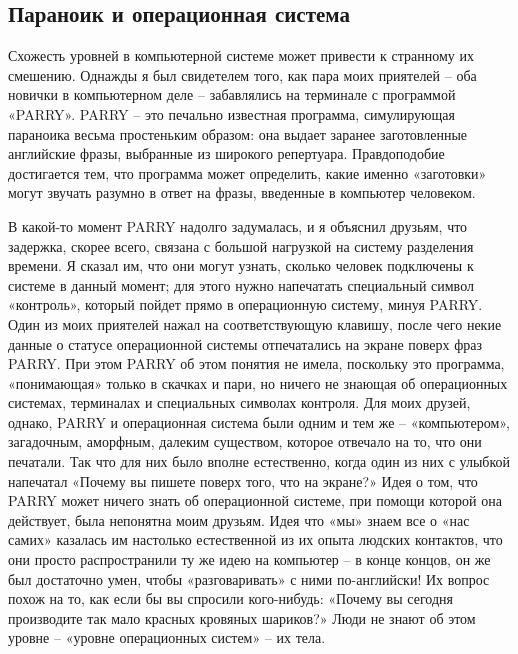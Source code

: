 \documentclass[../main.tex]{subfiles}
\begin{document}
\subsection{Параноик и операционная система}

Схожесть уровней в компьютерной системе может привести к странному их смешению. Однажды я был свидетелем того, как пара моих приятелей \--- оба новички в компьютерном деле \--- забавлялись на терминале с программой «PARRY». PARRY \--- это печально известная программа, симулирующая параноика весьма простеньким образом: она выдает заранее заготовленные английские фразы, выбранные из широкого репертуара. Правдоподобие достигается тем, что программа может определить, какие именно «заготовки» могут звучать разумно в ответ на фразы, введенные в компьютер человеком.

В какой-то момент PARRY надолго задумалась, и я объяснил друзьям, что задержка, скорее всего, связана с большой нагрузкой на систему разделения времени. Я сказал им, что они могут узнать, сколько человек подключены к системе в данный момент; для этого нужно напечатать специальный символ «контроль», который пойдет прямо в операционную систему, минуя PARRY. Один из моих приятелей нажал на соответствующую клавишу, после чего некие данные о статусе операционной системы отпечатались на экране поверх фраз PARRY. При этом PARRY об этом понятия не имела, поскольку это программа, «понимающая» только в скачках и пари, но ничего не знающая об операционных системах, терминалах и специальных символах контроля. Для моих друзей, однако, PARRY и операционная система были одним и тем же \--- «компьютером», загадочным, аморфным, далеким существом, которое отвечало на то, что они печатали. Так что для них было вполне естественно, когда один из них с улыбкой напечатал «Почему вы пишете поверх того, что на экране?» Идея о том, что PARRY может ничего знать об операционной системе, при помощи которой она действует, была непонятна моим друзьям. Идея что «мы» знаем все о «нас самих» казалась им настолько естественной из их опыта людских контактов, что они просто распространили ту же идею на компьютер \--- в конце концов, он же был достаточно умен, чтобы «разговаривать» с ними по-английски! Их вопрос похож на то, как если бы вы спросили кого-нибудь: «Почему вы сегодня производите так мало красных кровяных шариков?» Люди не знают об этом уровне \--- «уровне операционных систем» \--- их тела.
\end{document}
